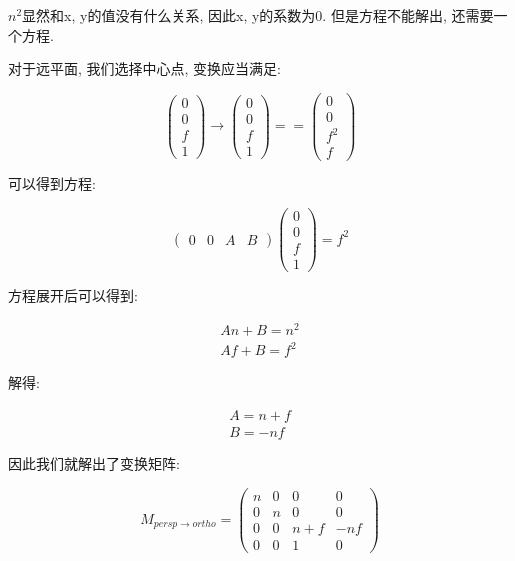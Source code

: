 \documentclass[openany]{progbookcn}
\begin{document}
$n^2$显然和x, y的值没有什么关系, 因此x, y的系数为0. 但是方程不能解出, 还需要一个方程. 

对于远平面, 我们选择中心点, 变换应当满足: 

\begin{equation}
	\begin{pmatrix}0\\0\\f\\1\end{pmatrix}\rightarrow\begin{pmatrix}0\\0\\f\\1\end{pmatrix}==\begin{pmatrix}0\\0\\f^2\\f\end{pmatrix}
\end{equation}

可以得到方程: 

\begin{equation}
	\begin{pmatrix}0&0&A&B\end{pmatrix}\begin{pmatrix}0\\0\\f\\1\end{pmatrix}=f^2
\end{equation}

方程展开后可以得到: 

\begin{equation}
	\begin{split}
		An+B=n^2\\
		Af+B=f^2
	\end{split}
\end{equation}

解得: 

\begin{equation}
	\begin{split}
		A=n+f\\
		B=-nf
	\end{split}
\end{equation}

因此我们就解出了变换矩阵: 

\begin{equation}
	M_{persp\rightarrow ortho}=\begin{pmatrix}n&0&0&0\\0&n&0&0\\0&0&n+f&-nf\\0&0&1&0\end{pmatrix}
\end{equation}
\end{document}
